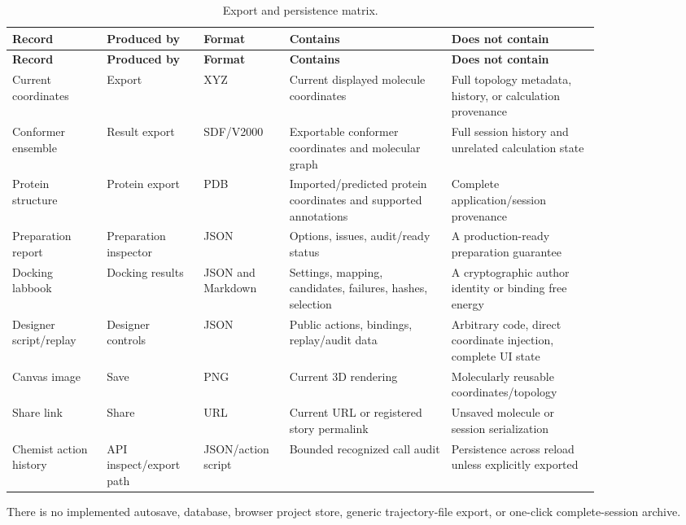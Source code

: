 \documentclass[11pt]{article}
\begin{document}
\begin{small}
\begin{longtable}{@{}>{\raggedright\arraybackslash}p{0.14\linewidth}>{\raggedright\arraybackslash}p{0.14\linewidth}>{\raggedright\arraybackslash}p{0.10\linewidth}>{\raggedright\arraybackslash}p{0.24\linewidth}>{\raggedright\arraybackslash}p{0.22\linewidth}@{}}
\caption{Export and persistence matrix.}\label{tab:appB_export}\\
\toprule
\textbf{Record} & \textbf{Produced by} & \textbf{Format} & \textbf{Contains} & \textbf{Does not contain}\\
\midrule
\endfirsthead
\toprule
\textbf{Record} & \textbf{Produced by} & \textbf{Format} & \textbf{Contains} & \textbf{Does not contain}\\
\midrule
\endhead
Current coordinates & Export & XYZ & Current displayed molecule coordinates & Full topology metadata, history, or calculation provenance\\
Conformer ensemble & Result export & SDF/V2000 & Exportable conformer coordinates and molecular graph & Full session history and unrelated calculation state\\
Protein structure & Protein export & PDB & Imported/predicted protein coordinates and supported annotations & Complete application/session provenance\\
Preparation report & Preparation inspector & JSON & Options, issues, audit/ready status & A production-ready preparation guarantee\\
Docking labbook & Docking results & JSON and Markdown & Settings, mapping, candidates, failures, hashes, selection & A cryptographic author identity or binding free energy\\
Designer script/replay & Designer controls & JSON & Public actions, bindings, replay/audit data & Arbitrary code, direct coordinate injection, complete UI state\\
Canvas image & Save & PNG & Current 3D rendering & Molecularly reusable coordinates/topology\\
Share link & Share & URL & Current URL or registered story permalink & Unsaved molecule or session serialization\\
Chemist action history & API inspect/export path & JSON/action script & Bounded recognized call audit & Persistence across reload unless explicitly exported\\
\bottomrule
\end{longtable}

There is no implemented autosave, database, browser project store, generic trajectory-file export, or one-click complete-session archive.


\end{small}
\end{document}
